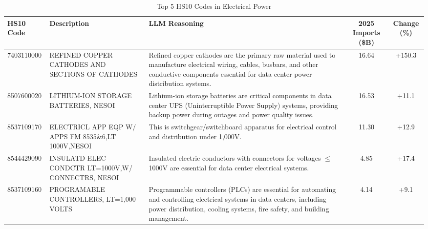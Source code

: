\begin{table}[htbp]
\centering
\small
\caption{Top 5 HS10 Codes in Electrical Power}
\label{tab:top5_electrical_power}
\setlength{\tabcolsep}{1.25mm}
\renewcommand{\arraystretch}{1.80}
\begin{tabular}{lp{3.5cm}p{3.5cm}cc}
\toprule
HS10 Code & Description & LLM Reasoning & 2025 Imports (\$B) & Change (\%) \\
\midrule
7403110000 & {\footnotesize REFINED COPPER CATHODES AND SECTIONS OF CATHODES} & {\footnotesize Refined copper cathodes are the primary raw material used to manufacture electrical wiring, cables, busbars, and other conductive components essential for data center power distribution systems.} & 16.64 & +150.3 \\
8507600020 & {\footnotesize LITHIUM-ION STORAGE BATTERIES, NESOI} & {\footnotesize Lithium-ion storage batteries are critical components in data center UPS (Uninterruptible Power Supply) systems, providing backup power during outages and power quality issues.} & 16.53 & +11.1 \\
8537109170 & {\footnotesize ELECTRICL APP EQP W/ APPS FM 8535\&6,LT 1000V,NESOI} & {\footnotesize This is switchgear/switchboard apparatus for electrical control and distribution under 1,000V.} & 11.30 & +12.9 \\
8544429090 & {\footnotesize INSULATD ELEC CONDCTR LT=1000V,W/ CONNECTRS, NESOI} & {\footnotesize Insulated electric conductors with connectors for voltages $\leq$1000V are essential for data center electrical systems.} & 4.85 & +17.4 \\
8537109160 & {\footnotesize PROGRAMABLE CONTROLLERS, LT=1,000 VOLTS} & {\footnotesize Programmable controllers (PLCs) are essential for automating and controlling electrical systems in data centers, including power distribution, cooling systems, fire safety, and building management.} & 4.14 & +9.1 \\
\bottomrule
\end{tabular}
\end{table}


